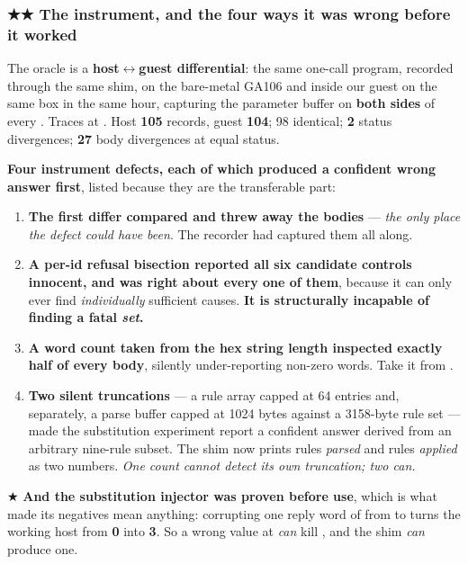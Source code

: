 \documentclass[10.5pt]{article}
\begin{document}
\subsubsection*{★★ The instrument, and the four ways it was wrong before it worked}

The oracle is a \textbf{host$\leftrightarrow$guest differential}: the same one-call program,
recorded through the same  shim, on the bare-metal GA106 and inside our guest
on the same box in the same hour, capturing the parameter buffer on \textbf{both sides} of every
. Traces at . Host \textbf{105} records, guest
\textbf{104}; 98 identical; \textbf{2} status divergences; \textbf{27} body divergences at equal
status.

\textbf{Four instrument defects, each of which produced a confident wrong answer first}, listed
because they are the transferable part:

\begin{enumerate}[itemsep=0.35ex]
\item \textbf{The first differ compared  and threw away the
  bodies} — \emph{the only place the defect could have been}. The recorder had captured them all
  along.
\item \textbf{A per-id refusal bisection reported all six candidate controls innocent, and was
  right about every one of them}, because it can only ever find \emph{individually} sufficient
  causes. \textbf{It is structurally incapable of finding a fatal \emph{set}.}
\item \textbf{A word count taken from the hex string length inspected exactly half of every
  body}, silently under-reporting non-zero words. Take it from .
\item \textbf{Two silent truncations} — a rule array capped at 64 entries and, separately, a parse
  buffer capped at 1024 bytes against a 3158-byte rule set — made the substitution experiment
  report a confident answer derived from an arbitrary nine-rule subset. The shim now prints rules
  \emph{parsed} and rules \emph{applied} as two numbers. \emph{One count cannot detect its own
  truncation; two can.}
\end{enumerate}

★ \textbf{And the substitution injector was proven before use}, which is what made its negatives
mean anything: corrupting one reply word of  from  to  turns
the working host from \textbf{0} into \textbf{3}. So a wrong value at  \emph{can}
kill , and the shim \emph{can} produce one.
\end{document}
